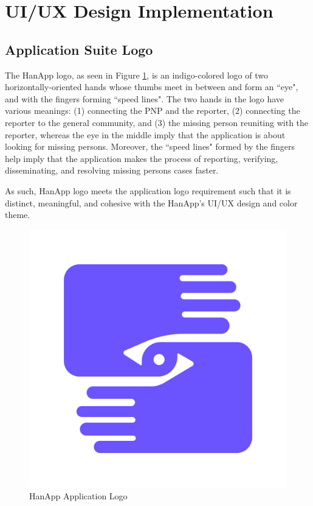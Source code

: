 \section{UI/UX Design Implementation}

\subsection{Application Suite Logo}

The HanApp logo, as seen in Figure \ref{fig:hanappLogo}, is an indigo-colored logo of two horizontally-oriented hands whose thumbs meet in between and form an ``eye", and with the fingers forming ``speed lines". The two hands in the logo have various meanings: (1) connecting the PNP and the reporter, (2) connecting the reporter to the general community, and (3) the missing person reuniting with the reporter, whereas the eye in the middle imply that the application is about looking for missing persons. Moreover, the ``speed lines" formed by the fingers help imply that the application makes the process of reporting, verifying, disseminating, and resolving missing persons cases faster. 

As such, HanApp logo meets the application logo requirement such that it is distinct, meaningful, and cohesive with the HanApp's UI/UX design and color theme.
\begin{figure}[!h]
    \centering
    \begin{minipage}[c]{0.50\linewidth}
        \centering
        \includegraphics[scale=0.15]{figures/hanappLogo.png}
        \caption{HanApp Application Logo}
        \label{fig:hanappLogo}
    \end{minipage}
\end{figure}

